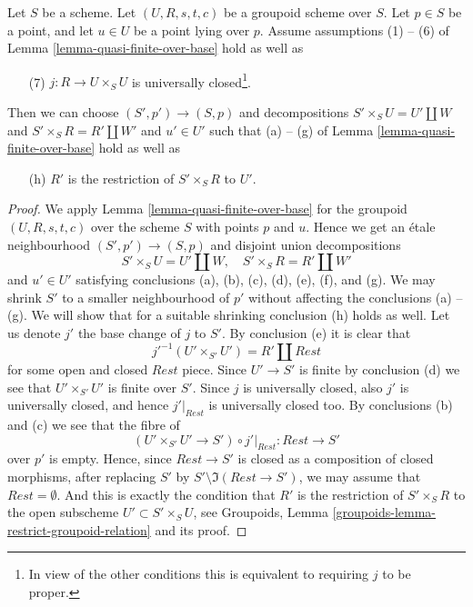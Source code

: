 \begin{lemma}
\label{lemma-quasi-finite-over-base-j-proper}
Let $S$ be a scheme.
Let $(U, R, s, t, c)$ be a groupoid scheme over $S$.
Let $p \in S$ be a point, and let $u \in U$ be a point lying over $p$.
Assume assumptions (1) -- (6) of
Lemma \ref{lemma-quasi-finite-over-base}
hold as well as
\begin{enumerate}
\item[(7)] $j : R \to U \times_S U$ is universally closed\footnote{In view of
the other conditions this is equivalent to requiring $j$ to be proper.}.
\end{enumerate}
Then we can choose $(S', p') \to (S, p)$ and decompositions
$S' \times_S U = U' \amalg W$ and $S' \times_S R = R' \amalg W'$
and $u' \in U'$ such that (a) -- (g) of
Lemma \ref{lemma-quasi-finite-over-base}
hold as well as
\begin{enumerate}
\item[(h)] $R'$ is the restriction of $S' \times_S R$ to $U'$.
\end{enumerate}
\end{lemma}

\begin{proof}
We apply Lemma \ref{lemma-quasi-finite-over-base} for the
groupoid $(U, R, s, t, c)$ over the scheme $S$ with points $p$ and $u$.
Hence we get an \'etale neighbourhood
$(S', p') \to (S, p)$ and disjoint union decompositions
$$
S' \times_S U = U' \amalg W, \quad
S' \times_S R = R' \amalg W'
$$
and $u' \in U'$ satisfying conclusions (a), (b), (c), (d), (e), (f), and (g).
We may shrink $S'$ to a smaller neighbourhood of $p'$ without
affecting the conclusions (a) -- (g). We will show that for a suitable
shrinking conclusion (h) holds as well.
Let us denote $j'$ the base change of $j$ to $S'$.
By conclusion (e) it is clear that
$$
j'^{-1}(U' \times_{S'} U') = R' \amalg Rest
$$
for some open and closed $Rest$ piece. Since $U' \to S'$ is finite
by conclusion (d) we see that $U' \times_{S'} U'$ is finite over $S'$.
Since $j$ is universally closed, also $j'$ is universally closed, and
hence $j'|_{Rest}$ is universally closed too. By conclusions
(b) and (c) we see that the fibre of
$$
(U' \times_{S'} U' \to S') \circ j'|_{Rest} :
Rest
\longrightarrow
S'
$$
over $p'$ is empty. Hence, since $Rest \to S'$ is closed as a composition
of closed morphisms, after replacing $S'$ by
$S' \setminus \Im(Rest \to S')$, we may assume that
$Rest = \emptyset$. And this is exactly the condition that $R'$ is
the restriction of $S' \times_S R$ to the open subscheme
$U' \subset S' \times_S U$, see
Groupoids, Lemma \ref{groupoids-lemma-restrict-groupoid-relation}
and its proof.
\end{proof}






